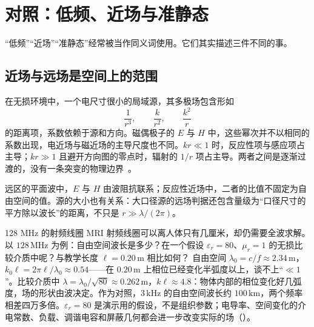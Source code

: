 \section{对照：低频、近场与准静态}\label{sec:regimes-labels}

“低频”“近场”“准静态”经常被当作同义词使用。它们其实描述三件不同的事。

\subsection{近场与远场是空间上的范围}
在无损环境中，一个电尺寸很小的局域源，其多极场包含形如
\begin{equation}
\frac{1}{r^3},\qquad \frac{k}{r^2},\qquad \frac{k^2}{r}
\label{eq:nearfar}
\end{equation}
的距离项，系数依赖于源和方向。磁偶极子的 $E$ 与 $H$ 中，这些幂次并不以相同的系数出现，电近场与磁近场的主导尺度也不同。$kr\ll1$ 时，反应性项与感应项占主导；$kr\gg1$ 且避开方向图的零点时，辐射的 $1/r$ 项占主导。两者之间是逐渐过渡的，没有一条突变的物理边界~\cite{haus}。


远区的平面波中，$E$ 与 $H$ 由波阻抗联系；反应性近场中，二者的比值不固定为自由空间的值。源的大小也有关系：大口径源的远场判据还包含量级为“口径尺寸的平方除以波长”的距离，不只是 $r\gg\lambda/(2\pi)$。

\begin{example}{128 MHz 的射频线圈}\label{ex:regimes-rf}
MRI 射频线圈可以离人体只有几厘米，却仍需要全波求解。以 $128\,\mathrm{MHz}$ 为例：自由空间波长是多少？在一个假设 $\varepsilon_r=80$、$\mu_r=1$ 的无损比较介质中呢？与教学长度 $\ell=0.20\,\mathrm m$ 相比如何？
\solution
自由空间 $\lambda_0=c/f\approx2.34\,\mathrm m$，$k_0\ell=2\pi\ell/\lambda_0\approx0.54$——在 $0.20\,\mathrm m$ 上相位已经变化半弧度以上，谈不上“$\ll1$”。比较介质中 $\lambda=\lambda_0/\sqrt{80}\approx0.262\,\mathrm m$，$k\ell\approx4.8$：物体内部的相位变化好几弧度，场的形状由波决定。作为对照，$3\,\mathrm{kHz}$ 的自由空间波长约 $100\,\mathrm{km}$，两个频率相差四万多倍。$\varepsilon_r=80$ 是演示用的假设，不是组织参数；电导率、空间变化的介电常数、负载、调谐电容和屏蔽几何都会进一步改变实际的场（）。
\end{example}

